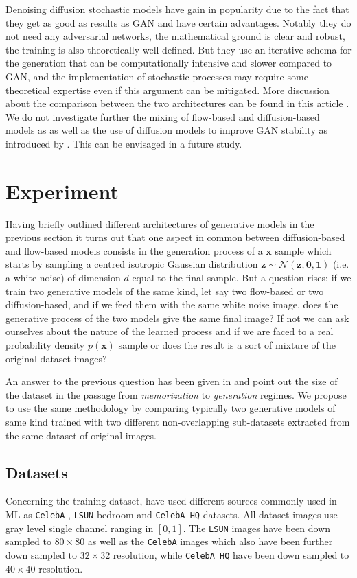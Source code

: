 \documentclass[11pt]{amsart}
\begin{document}
Denoising diffusion stochastic models have gain in popularity due to the fact that they get as good as results as GAN and have certain advantages. Notably they do not need any adversarial networks, the mathematical ground is clear and robust, the training is also theoretically well defined. But they use an iterative schema for the generation that can be computationally intensive and slower compared to GAN, and the implementation of stochastic processes may require some theoretical expertise even if this argument can be mitigated. More discussion about the comparison between the two architectures  can be found in this article \cite{dhariwal2021diffusion}. We do not investigate further the mixing of flow-based and diffusion-based models as \citep[e.g.][]{zhang2021diffusion,gong2021interpreting} as well as the use of diffusion models to improve GAN stability as introduced by \cite{Wang2022}. This can be envisaged in a future study.
%
\section{Experiment}
%
Having briefly outlined different architectures of generative models in the previous section it turns out that one aspect in common between diffusion-based and flow-based models consists in the generation process of a $\bm{x}$ sample which starts by sampling a centred isotropic Gaussian distribution $\bm{z}\sim \mathcal{N}(\bm{z},\bm{0},\bm{1})$ (i.e. a white noise) of dimension $d$ equal to the final sample. But a question rises: if we train two generative models of the same kind, let say two flow-based or two diffusion-based, and if we feed them with the same white noise image, does the generative process of the two models give the same final image? If not we can ask ourselves about the nature of the learned process and if we are faced to a real probability density $p(\bm{x})$ sample or does the result is a sort of mixture of the original dataset images? 

An answer to the previous question has been given in \cite{kadkhodaie2024generalization} and point out the size of the dataset in the passage from \textit{memorization} to \textit{generation} regimes. We propose to use the same methodology by comparing typically two generative models of same kind trained with two different non-overlapping sub-datasets extracted from the same dataset of original images.

%
\subsection{Datasets}
%
Concerning the training dataset, \cite{kadkhodaie2024generalization}  have used different sources commonly-used in ML as \texttt{CelebA} \citep{Liu2015}, \texttt{LSUN} bedroom \citep{Yu2015} and  \texttt{CelebA HQ} \citep{KarrasALL18} datasets. All dataset images use  gray level single channel ranging in $[0,1]$.  The \texttt{LSUN}  images have been down sampled to $80\times 80$ as well as the \texttt{CelebA} images which also have been further down sampled to $32\times 32$ resolution, while \texttt{CelebA HQ}  have been down sampled to $40\times 40$ resolution.
\end{document}
